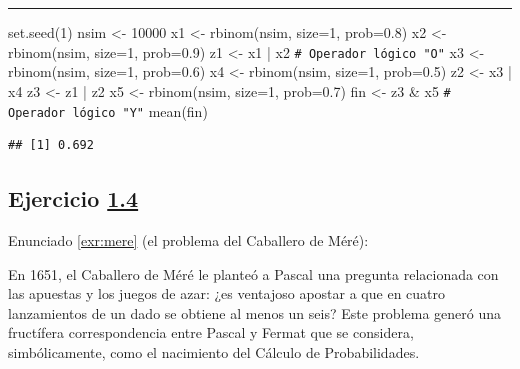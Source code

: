 \documentclass[
]{book}
\newenvironment{Shaded}{\begin{snugshade}}{\end{snugshade}}
\newcommand{\AttributeTok}[1]{\textcolor[rgb]{0.77,0.63,0.00}{#1}}
\newcommand{\CommentTok}[1]{\textcolor[rgb]{0.56,0.35,0.01}{\textit{#1}}}
\newcommand{\DecValTok}[1]{\textcolor[rgb]{0.00,0.00,0.81}{#1}}
\newcommand{\FloatTok}[1]{\textcolor[rgb]{0.00,0.00,0.81}{#1}}
\newcommand{\FunctionTok}[1]{\textcolor[rgb]{0.00,0.00,0.00}{#1}}
\newcommand{\NormalTok}[1]{#1}
\newcommand{\OtherTok}[1]{\textcolor[rgb]{0.56,0.35,0.01}{#1}}
\newcommand{\SpecialCharTok}[1]{\textcolor[rgb]{0.00,0.00,0.00}{#1}}
\theoremstyle{break}
\theoremstyle{nonumberplain}
\renewcommand{\CommentTok}[1]{\textcolor[rgb]{0.41,0.41,0.41}{\texttt{#1}}}
\begin{document}
\begin{center}\rule{0.5\linewidth}{0.5pt}\end{center}

\begin{Shaded}
\begin{Highlighting}[]
\FunctionTok{set.seed}\NormalTok{(}\DecValTok{1}\NormalTok{)}
\NormalTok{nsim }\OtherTok{\textless{}{-}} \DecValTok{10000}
\NormalTok{x1 }\OtherTok{\textless{}{-}} \FunctionTok{rbinom}\NormalTok{(nsim, }\AttributeTok{size=}\DecValTok{1}\NormalTok{, }\AttributeTok{prob=}\FloatTok{0.8}\NormalTok{)}
\NormalTok{x2 }\OtherTok{\textless{}{-}} \FunctionTok{rbinom}\NormalTok{(nsim, }\AttributeTok{size=}\DecValTok{1}\NormalTok{, }\AttributeTok{prob=}\FloatTok{0.9}\NormalTok{)}
\NormalTok{z1 }\OtherTok{\textless{}{-}}\NormalTok{ x1 }\SpecialCharTok{|}\NormalTok{ x2   }\CommentTok{\# Operador lógico "O"}
\NormalTok{x3 }\OtherTok{\textless{}{-}} \FunctionTok{rbinom}\NormalTok{(nsim, }\AttributeTok{size=}\DecValTok{1}\NormalTok{, }\AttributeTok{prob=}\FloatTok{0.6}\NormalTok{)}
\NormalTok{x4 }\OtherTok{\textless{}{-}} \FunctionTok{rbinom}\NormalTok{(nsim, }\AttributeTok{size=}\DecValTok{1}\NormalTok{, }\AttributeTok{prob=}\FloatTok{0.5}\NormalTok{)}
\NormalTok{z2 }\OtherTok{\textless{}{-}}\NormalTok{ x3 }\SpecialCharTok{|}\NormalTok{ x4}
\NormalTok{z3 }\OtherTok{\textless{}{-}}\NormalTok{ z1 }\SpecialCharTok{|}\NormalTok{ z2}
\NormalTok{x5 }\OtherTok{\textless{}{-}} \FunctionTok{rbinom}\NormalTok{(nsim, }\AttributeTok{size=}\DecValTok{1}\NormalTok{, }\AttributeTok{prob=}\FloatTok{0.7}\NormalTok{)}
\NormalTok{fin }\OtherTok{\textless{}{-}}\NormalTok{ z3 }\SpecialCharTok{\&}\NormalTok{ x5  }\CommentTok{\# Operador lógico "Y"}
\FunctionTok{mean}\NormalTok{(fin)}
\end{Highlighting}
\end{Shaded}

\begin{verbatim}
## [1] 0.692
\end{verbatim}

\hypertarget{sol-mere}{%
\subsection{\texorpdfstring{Ejercicio \href{ejercicios.html\#exr:mere}{1.4}}{Ejercicio 1.4}}\label{sol-mere}}

Enunciado \ref{exr:mere} (el problema del Caballero de Méré):

En 1651, el Caballero de Méré le planteó a Pascal una pregunta
relacionada con las apuestas y los juegos de azar: ¿es ventajoso
apostar a que en cuatro lanzamientos de un dado se obtiene al menos
un seis? Este problema generó una fructífera correspondencia entre
Pascal y Fermat que se considera, simbólicamente, como el nacimiento
del Cálculo de Probabilidades.
\end{document}

